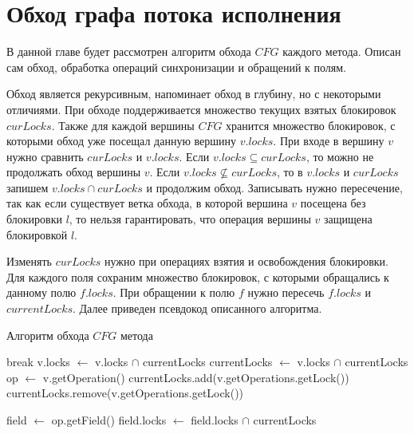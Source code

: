 \section{Обход графа потока исполнения}
В данной главе будет рассмотрен алгоритм обхода $CFG$ каждого метода. Описан сам обход, обработка операций синхронизации и обращений к полям. 

Обход является рекурсивным, напоминает обход в глубину, но с некоторыми отличиями. При обходе поддерживается множество текущих взятых блокировок $curLocks$. Также для каждой вершины $CFG$ хранится множество блокировок, с которыми обход уже посещал данную вершину $v.locks$.
При входе в вершину $v$ нужно сравнить $curLocks$ и $v.locks$. Если $v.locks \subseteq curLocks$, то можно не продолжать обход вершины $v$. Если $v.locks \nsubseteq curLocks$, то в $v.locks$ и $curLocks$ запишем  $v.locks \cap curLocks$ и продолжим обход. Записывать нужно пересечение, так как если существует ветка обхода, в которой вершина $v$ посещена без блокировки $l$, то нельзя гарантировать, что операция вершины $v$ защищена блокировкой $l$. 

Изменять $curLocks$ нужно при операциях взятия и освобождения блокировки. Для каждого поля сохраним множество блокировок, с которыми обращались к данному полю $f.locks$. При обращении к полю $f$ нужно пересечь $f.locks$ и 
$currentLocks$.
Далее приведен псевдокод описанного алгоритма.

\begin{algorithm}
\caption{Алгоритм обхода $CFG$ метода}\label{alg:TraverseCFG}
\begin{algorithmic}
	\State break
\Else
	\State v.locks $\gets$ v.locks $\cap$ currentLocks 
	\State currentLocks $\gets$ v.locks $\cap$ currentLocks 
\EndIf
\State op $\gets$ v.getOperation()
	\State currentLocks.add(v.getOperations.getLock())
\EndIf
{}
	\State currentLocks.remove(v.getOperations.getLock())
\EndIf

	\State field $\gets$ op.getField()
	\State field.locks $\gets$ field.locks $\cap$ currentLocks
\EndIf

	\State {}
\EndFor

\EndFunction
 
\end{algorithmic}
\end{algorithm}

